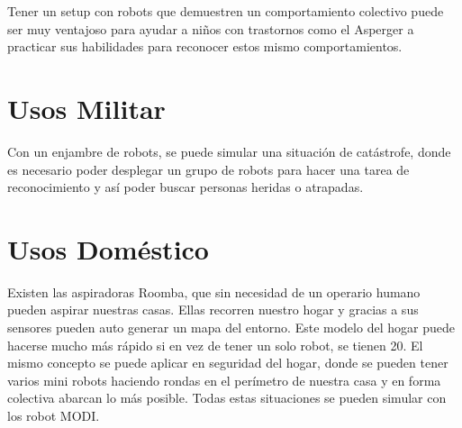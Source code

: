Tener un setup con robots que demuestren un comportamiento colectivo puede ser muy ventajoso para ayudar a niños con trastornos como el Asperger a practicar sus habilidades para reconocer estos mismo comportamientos.

\section{Usos Militar}

Con un enjambre de robots, se puede simular una situación de catástrofe, donde es necesario poder desplegar un grupo de robots para hacer una tarea de reconocimiento y así poder buscar personas heridas o atrapadas.

\section{Usos Doméstico}

Existen las aspiradoras Roomba, que sin necesidad de un operario humano pueden aspirar nuestras casas. Ellas recorren nuestro hogar y gracias a sus sensores pueden auto generar un mapa del entorno. Este modelo del hogar puede hacerse mucho más rápido si en vez de tener un solo robot, se tienen 20. El mismo concepto se puede aplicar en seguridad del hogar, donde se pueden tener varios mini robots haciendo rondas en el perímetro de nuestra casa y en forma colectiva abarcan lo más posible. Todas estas situaciones se pueden simular con los robot MODI.
